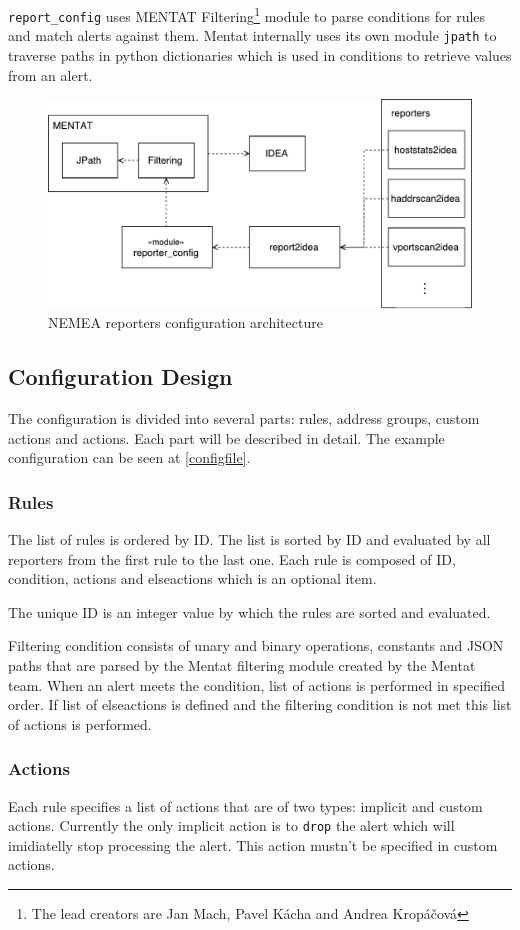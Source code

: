 \documentclass[11pt,a4paper]{article}
\begin{document}
\texttt{report\_config} uses MENTAT Filtering\footnote{The lead creators are Jan Mach, Pavel Kácha and Andrea Kropáčová} module to parse conditions for rules and match alerts against them. Mentat internally uses its own module \texttt{jpath} to traverse paths in python dictionaries which is used in conditions to retrieve values from an alert.

\begin{figure}[h]
    \includegraphics[width=0.7\linewidth]{schema.pdf}
    \centering
	\caption{NEMEA reporters configuration architecture}
    \label{schema}
\end{figure}

\subsection{Configuration Design}
\label{confdesign}
The configuration is divided into several parts: rules, address groups, custom actions and actions. Each part will be described in detail. The example configuration can be seen at \ref{configfile}.

\subsubsection{Rules}
The list of rules is ordered by ID. The list is sorted by ID and evaluated by all reporters from the first rule to the last one. Each rule is composed of ID, condition, actions and elseactions which is an optional item.

The unique ID is an integer value by which the rules are sorted and evaluated.

Filtering condition consists of unary and binary operations, constants and JSON paths that are parsed by the Mentat filtering module created by the Mentat team. When an alert meets the condition, list of actions is performed in specified order. If list of elseactions is defined and the filtering condition is not met this list of actions is performed.

\subsubsection{Actions}
Each rule specifies a list of actions that are of two types: implicit and custom actions. Currently the only implicit action is to \texttt{drop} the alert which will imidiatelly stop processing the alert. This action mustn't be specified in custom actions.
\end{document}
